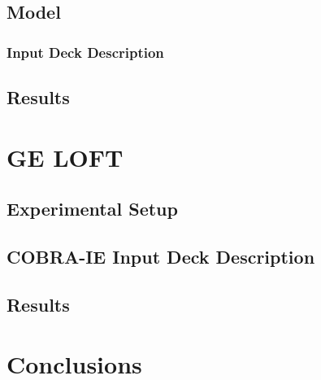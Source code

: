 \subsection{Model}
\subsubsection{Input Deck Description}
\subsection{Results}

\section{GE LOFT}
\subsection{Experimental Setup}
\subsection{COBRA-IE Input Deck Description}
\subsection{Results}

\section{Conclusions}



